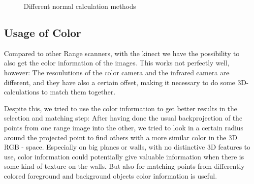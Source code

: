 \documentclass[10pt,twocolumn,letterpaper]{article}
\begin{document}
\begin{figure}
  \centering
  \quad
  \quad
  \caption{Different normal calculation methods}
  \label{fig:normals}
\end{figure}

\subsection{Usage of Color}
\label{colormatching}
Compared to other Range scanners, with the kinect we have the possibility to also get the color information of the images.
This works not perfectly well, however: The resoulutions of the color camera and the infrared camera are different, and
they have also a certain offset, making it necessary to do some 3D-calculations to match them together.

Despite this, we tried to use the color information to get better results in the selection and matching step: After having
done the usual backprojection of the points from one range image into the other, we tried to look in a certain radius around
the projected point to find others with a more similar color in the 3D RGB - space. Especially on big planes or walls, with
no distinctive 3D features to use, color information could potentially give valuable information when there is some kind
of texture on the walls. But also for matching points from differently colored foreground and background objects color
information is useful.
\end{document}
